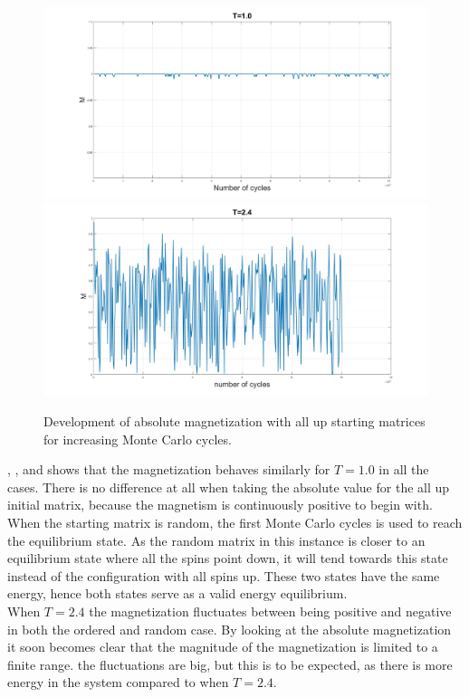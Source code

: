 \documentclass[10pt,a4paper]{article}
\begin{document}
\begin{figure} [H]
\centerline{
\includegraphics[scale=0.15]{UPmag1abs.jpg}
\includegraphics[scale=0.15]{UPmag24abs.jpg}
}
\caption{Development of absolute magnetization with all up starting matrices for increasing Monte Carlo cycles.}
\label{fig:UpMagnetizm}
\end{figure}
\noindent {}, ,  and  shows that the magnetization behaves similarly for $T=1.0$ in all the cases. There is no difference at all when taking the absolute value for the all up initial matrix, because the magnetism is continuously positive to begin with. When the starting matrix is random, the first Monte Carlo cycles is used to reach the equilibrium state. As the random matrix in this instance is closer to an equilibrium state where all the spins point down, it will tend towards this state instead of the configuration with all spins up. These two states have the same energy, hence both states serve as a valid energy equilibrium. \\

\noindent When $T=2.4$ the magnetization fluctuates between being positive and negative in both the ordered and random case. By looking at the absolute magnetization it soon becomes clear that the magnitude of the magnetization is limited to a finite range. the fluctuations are big, but this is to be expected, as there is more energy in the system compared to when $T=2.4$. 
\end{document}
